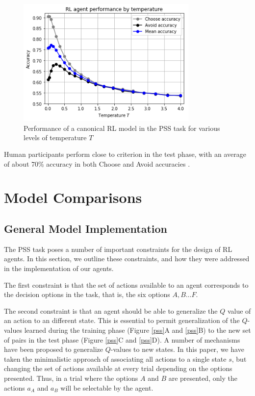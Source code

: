 \documentclass[10pt,letterpaper]{article}
\begin{document}
\begin{figure}[ht]
	\begin{center}
		\includegraphics[width=3.5in]{rl-performance.png}
	\end{center}
	\caption{Performance of a canonical RL model in the PSS task for various levels of temperature $T$} 
	\label{RL-agent-performance}
\end{figure}

Human participants perform close to criterion in the test phase, with an average of about 70\% accuracy in both Choose and Avoid accuracies \cite{frank2004carrot, frank2007genetic, stocco2017individual}.

\section{Model Comparisons}

\subsection{General Model Implementation}

The PSS task poses a number of important constraints for the design of RL agents. In this section, we outline these constraints, and how they were addressed in the implementation of our agents. 

The first constraint is that the set of actions available to an agent corresponds to the decision options in the task, that is, the six options $A, B \dots F$. 

The second constraint is that an agent should be able to generalize the $Q$ value of an action to an different state. This is essential to permit generalization of the $Q$-values learned during the training phase (Figure \ref{pss}A and \ref{pss}B) to the new set of pairs in the test phase (Figure \ref{pss}C and \ref{pss}D). A number of mechanisms have been proposed to generalize $Q$-values to new states. In this paper, we have taken the minimalistic approach of associating all actions to a single state $s$, but changing the set of actions available at every trial depending on the options presented. Thus, in a trial where the options $A$ and $B$ are presented, only the actions $a_A$ and $a_B$ will be selectable by the agent.
\end{document}
